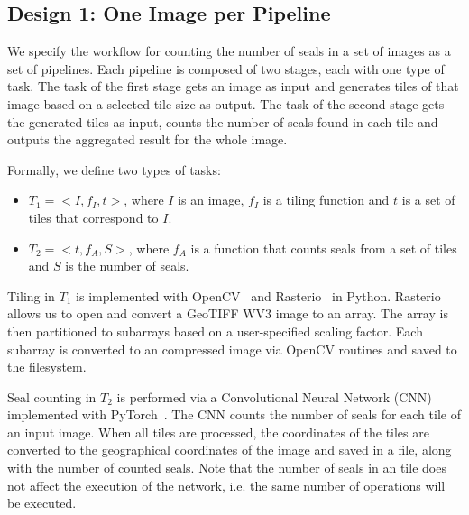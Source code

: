 \subsection{Design 1: One Image per Pipeline}
\label{ssec:approach1}\label{des1}



We specify the workflow for counting the number of seals in a set of images as a set of pipelines.
Each pipeline is composed of two stages, each with one type of task.
The task of the first stage gets an image as input and generates tiles of that image based on a selected tile size as output.
The task of the second stage gets the generated tiles as input, counts the number of seals found in each tile and outputs the aggregated result for the whole image.

Formally, we define two types of tasks:
\begin{itemize}
    \item $T_{1} = <I, f_{I}, t>$, where $I$ is an image, $f_{I}$ is a tiling function and $t$ is a set of tiles that correspond to $I$.
    \item $T_{2} = <t, f_{A}, S>$, where $f_{A}$ is a function that counts seals from a set of tiles and $S$ is the number of seals.
\end{itemize}


Tiling in $T_{1}$ is implemented with OpenCV~\cite{bradski2000opencv} and Rasterio~\cite{gillies2013rasterio} in Python.
Rasterio allows us to open and convert a GeoTIFF WV3 image to an array.
The array is then partitioned to sub\-arrays based on a user-specified scaling factor.
Each sub\-array is converted to an compressed image via OpenCV routines and saved to the filesystem.

Seal counting in $T_{2}$ is performed via a Convolutional Neural Network (CNN) implemented with PyTorch~\cite{paszke2017automatic}.
The CNN counts the number of seals for each tile of an input image.
When all tiles are processed, the coordinates of the tiles are converted to the geographical coordinates of the image and saved in a file, along with the number of counted seals. Note that the number of seals in an tile does not affect the execution of the network, i.e. the same number of operations will be executed.


